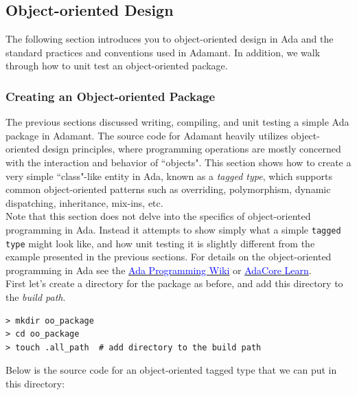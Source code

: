 \subsection{Object-oriented Design}

The following section introduces you to object-oriented design in Ada and the standard practices and conventions used in Adamant. In addition, we walk through how to unit test an object-oriented package.

\subsubsection{Creating an Object-oriented Package}

The previous sections discussed writing, compiling, and unit testing a simple Ada package in Adamant. The source code for Adamant heavily utilizes object-oriented design principles, where programming operations are mostly concerned with the interaction and behavior of ``objects". This section shows how to create a very simple ``class"-like entity in Ada, known as a \textit{tagged type}, which supports common object-oriented patterns such as overriding, polymorphism, dynamic dispatching, inheritance, mix-ins, etc. \\

Note that this section does not delve into the specifics of object-oriented programming in Ada. Instead it attempts to show simply what a simple \texttt{tagged type} might look like, and how unit testing it is slightly different from the example presented in the previous sections. For details on the object-oriented programming in Ada see the \href{https://en.wikibooks.org/wiki/Ada_Programming/Object_Orientation}{\textcolor{blue}{Ada Programming Wiki}} or \href{https://learn.adacore.com/courses/intro-to-ada/chapters/object_oriented_programming.html}{\textcolor{blue}{AdaCore Learn}}. \\

First let's create a directory for the package as before, and add this directory to the \textit{build path}.

\vspace{5mm} %
\begin{verbatim}
> mkdir oo_package 
> cd oo_package 
> touch .all_path  # add directory to the build path
\end{verbatim}
\vspace{5mm} %

Below is the source code for an object-oriented tagged type that we can put in this directory:

